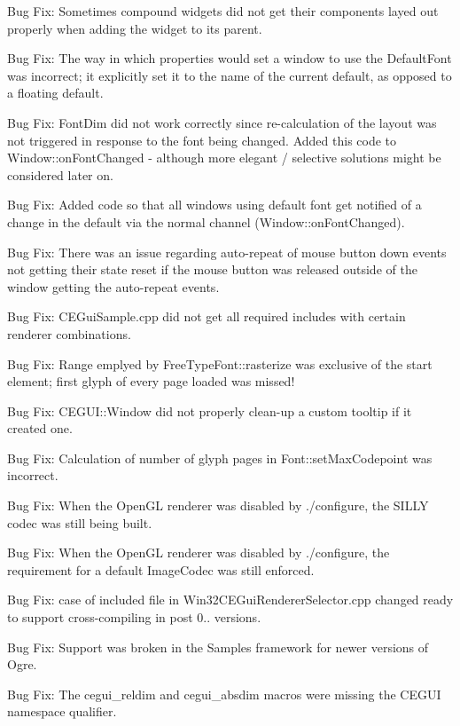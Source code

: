 \begin{DoxyItemize}
\item Bug Fix\+: Sometimes compound widgets did not get their components layed out properly when adding the widget to it\textquotesingle{}s parent.
\item Bug Fix\+: The way in which properties would set a window to use the Default\+Font was incorrect; it explicitly set it to the name of the current default, as opposed to a \textquotesingle{}floating default\textquotesingle{}.
\item Bug Fix\+: Font\+Dim did not work correctly since re-\/calculation of the layout was not triggered in response to the font being changed. Added this code to Window\+::on\+Font\+Changed -\/ although more elegant / selective solutions might be considered later on.
\item Bug Fix\+: Added code so that all windows using default font get notified of a change in the default via the normal channel (Window\+::on\+Font\+Changed).
\item Bug Fix\+: There was an issue regarding auto-\/repeat of mouse button down events not getting their state reset if the mouse button was released outside of the window getting the auto-\/repeat events.
\item Bug Fix\+: C\+E\+Gui\+Sample.\+cpp did not get all required includes with certain renderer combinations.
\item Bug Fix\+: Range emplyed by Free\+Type\+Font\+::rasterize was exclusive of the start element; first glyph of every page loaded was missed!
\item Bug Fix\+: C\+E\+G\+U\+I\+::\+Window did not properly clean-\/up a custom tooltip if it created one.
\item Bug Fix\+: Calculation of number of glyph pages in Font\+::set\+Max\+Codepoint was incorrect.
\item Bug Fix\+: When the Open\+GL renderer was disabled by ./configure, the S\+I\+L\+LY codec was still being built.
\item Bug Fix\+: When the Open\+GL renderer was disabled by ./configure, the requirement for a default Image\+Codec was still enforced.
\item Bug Fix\+: case of included file in Win32\+C\+E\+Gui\+Renderer\+Selector.\+cpp changed ready to support cross-\/compiling in post 0.. versions.
\item Bug Fix\+: Support was broken in the Samples framework for newer versions of Ogre.
\item Bug Fix\+: The cegui\+\_\+reldim and cegui\+\_\+absdim macros were missing the C\+E\+G\+UI namespace qualifier.

\end{DoxyItemize}
